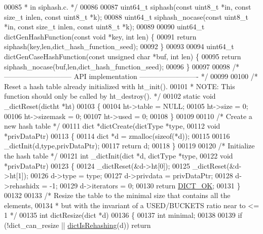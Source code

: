\begin{DoxyCode}
00085 \textcolor{comment}{ * in siphash.c. */}
00086 
00087 uint64\_t siphash(\textcolor{keyword}{const} uint8\_t *in, \textcolor{keyword}{const} size\_t inlen, \textcolor{keyword}{const} uint8\_t *k);
00088 uint64\_t siphash\_nocase(\textcolor{keyword}{const} uint8\_t *in, \textcolor{keyword}{const} size\_t inlen, \textcolor{keyword}{const} uint8\_t *k);
00089 
00090 uint64\_t dictGenHashFunction(\textcolor{keyword}{const} \textcolor{keywordtype}{void} *key, \textcolor{keywordtype}{int} len) \{
00091     \textcolor{keywordflow}{return} siphash(key,len,dict\_hash\_function\_seed);
00092 \}
00093 
00094 uint64\_t dictGenCaseHashFunction(\textcolor{keyword}{const} \textcolor{keywordtype}{unsigned} \textcolor{keywordtype}{char} *buf, \textcolor{keywordtype}{int} len) \{
00095     \textcolor{keywordflow}{return} siphash\_nocase(buf,len,dict\_hash\_function\_seed);
00096 \}
00097 
00098 \textcolor{comment}{/* ----------------------------- API implementation ------------------------- */}
00099 
00100 \textcolor{comment}{/* Reset a hash table already initialized with ht\_init().}
00101 \textcolor{comment}{ * NOTE: This function should only be called by ht\_destroy(). */}
00102 \textcolor{keyword}{static} \textcolor{keywordtype}{void} \_dictReset(dictht *ht)
00103 \{
00104     ht->table = NULL;
00105     ht->size = 0;
00106     ht->sizemask = 0;
00107     ht->used = 0;
00108 \}
00109 
00110 \textcolor{comment}{/* Create a new hash table */}
00111 dict *dictCreate(dictType *type,
00112         \textcolor{keywordtype}{void} *privDataPtr)
00113 \{
00114     dict *d = zmalloc(\textcolor{keyword}{sizeof}(*d));
00115 
00116     \_dictInit(d,type,privDataPtr);
00117     \textcolor{keywordflow}{return} d;
00118 \}
00119 
00120 \textcolor{comment}{/* Initialize the hash table */}
00121 \textcolor{keywordtype}{int} \_dictInit(dict *d, dictType *type,
00122         \textcolor{keywordtype}{void} *privDataPtr)
00123 \{
00124     \_dictReset(&d->ht[0]);
00125     \_dictReset(&d->ht[1]);
00126     d->type = type;
00127     d->privdata = privDataPtr;
00128     d->rehashidx = -1;
00129     d->iterators = 0;
00130     \textcolor{keywordflow}{return} \hyperlink{dict_8h_a2afecbeab8f7efbc183048f52f6d17e5}{DICT\_OK};
00131 \}
00132 
00133 \textcolor{comment}{/* Resize the table to the minimal size that contains all the elements,}
00134 \textcolor{comment}{ * but with the invariant of a USED/BUCKETS ratio near to <= 1 */}
00135 \textcolor{keywordtype}{int} dictResize(dict *d)
00136 \{
00137     \textcolor{keywordtype}{int} minimal;
00138 
00139     \textcolor{keywordflow}{if} (!dict\_can\_resize || \hyperlink{dict_8h_aa6e4917a6a32fdf47180e03ed8969e02}{dictIsRehashing}(d)) \textcolor{keywordflow}{return} 

\end{DoxyCode}
